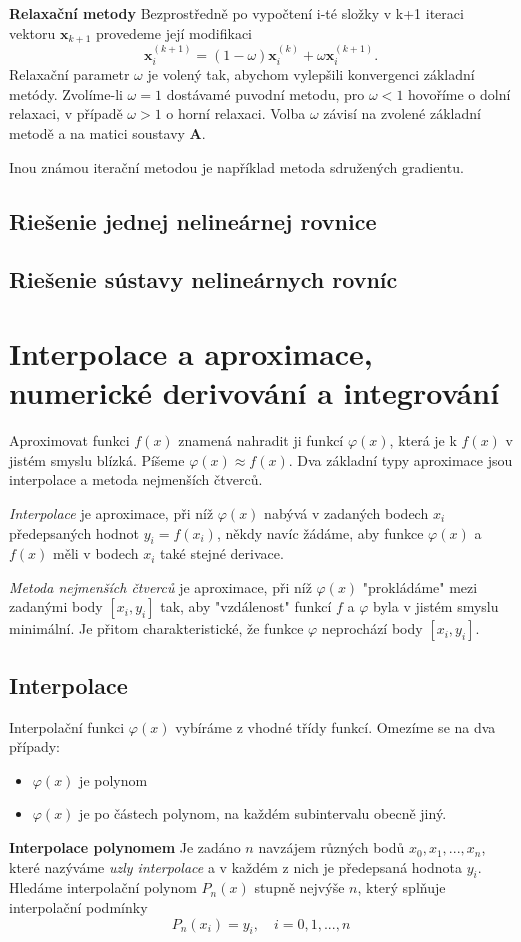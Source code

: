 \textbf{Relaxační metody}\newline
Bezprostředně po vypočtení i-té složky v k+1 iteraci vektoru  $\textbf{x}_{k+1}$ provedeme její modifikaci $$\textbf{x}^{(k+1)}_i=(1-\omega)\textbf{x}^{(k)}_i+\omega\textbf{x}^{(k+1)}_i.$$
Relaxační parametr $\omega$ je volený tak, abychom vylepšili konvergenci základní metódy. Zvolíme-li $\omega=1$ dostávamé puvodní metodu, pro $\omega<1$ hovoříme o dolní relaxaci, v případě $\omega>1$ o horní relaxaci. Volba $\omega$ závisí na zvolené základní metodě a na matici soustavy $\textbf{A}$.

Inou známou iterační metodou je například metoda sdružených gradientu.
\subsection{Riešenie jednej nelineárnej rovnice}  
\subsection{Riešenie sústavy nelineárnych rovníc}  

\section{Interpolace a aproximace, numerické derivování a integrování}  

Aproximovat funkci $f(x)$ znamená nahradit ji funkcí $\varphi(x)$, která je k $f(x)$ v jistém smyslu blízká. Píšeme $\varphi(x)\approx f(x)$. Dva základní typy aproximace jsou interpolace a metoda nejmenších čtverců.

\textit{Interpolace} je aproximace, při níž $\varphi(x)$ nabývá v zadaných bodech $x_i$ předepsaných hodnot $y_i=f(x_i)$, někdy navíc žádáme, aby funkce $\varphi(x)$ a $f(x)$ měli v bodech $x_i$ také stejné derivace.

\textit{Metoda nejmenších čtverců} je aproximace, při níž $\varphi(x)$ "prokládáme" mezi zadanými body $[x_i,y_i]$ tak, aby "vzdálenost" funkcí $f$ a $\varphi$ byla v jistém smyslu minimální. Je přitom charakteristické, že funkce $\varphi$ neprochází body $[x_i,y_i]$.

\subsection{Interpolace}
Interpolační funkci $\varphi(x)$ vybíráme z vhodné třídy funkcí. Omezíme se na dva případy:
\begin{itemize}
\item  $\varphi(x)$ je polynom 
\item $\varphi(x)$ je po částech polynom, na každém subintervalu obecně jiný.
\end{itemize} 
\textbf{Interpolace polynomem}
Je zadáno $n$ navzájem různých bodů $x_0,x_1,...,x_n$, které nazýváme \textit{uzly interpolace} a v každém z nich je předepsaná hodnota $y_i$. Hledáme interpolační polynom $P_n(x)$ stupně nejvýše $n$, který splňuje interpolační podmínky $$P_n(x_i)=y_i,\quad i=0,1,...,n$$


